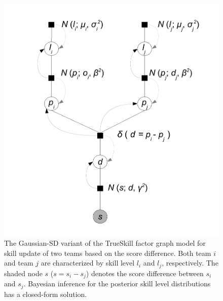 \begin{figure}
\centerline{\includegraphics[scale=0.35]{modelAndInferenceGaussianGraphicalModelScoreDifference}}
\caption{\small
The Gaussian-SD variant of the TrueSkill factor graph model for skill update of two teams based on the score difference. Both team
$i$ and team $j$ are characterized by skill level $l_i$ and $l_j$,
respectively. The shaded node $s$ ($s=s_i-s_j$) denotes the score
difference between $s_i$ and $s_j$. Bayesian inference for the posterior
skill level distributions has a closed-form solution.}
\label{fig:modelAndInferenceGaussianGraphicalModelScoreDifference}
\end{figure}
